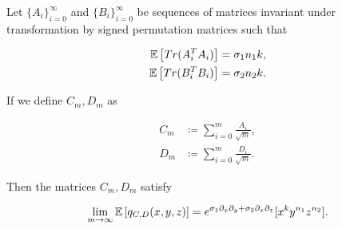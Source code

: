     \begin{theorem} \label{thm:exp_operator}
        Let $\{A_i\}_{i=0}^\infty$ and $\{B_i\}_{i=0}^\infty$ be sequences of matrices invariant under transformation by signed permutation matrices such that

        \begin{align*}
            \mathbb E \left[ Tr(A^T_iA_i) \right] &= \sigma_1 n_1 k,\\
            \mathbb E \left[ Tr(B^T_iB_i) \right] &= \sigma_2 n_2 k.
        \end{align*}

        If we define $C_m, D_m$ as

        \begin{align*}
            C_m &\coloneqq \sum_{i=0}^m \frac{A_i}{\sqrt m}, \\
            D_m &\coloneqq \sum_{i=0}^m \frac{D_i}{\sqrt m}.
        \end{align*}

        Then the matrices $C_m, D_m$ satisfy

        \begin{equation*}
            \lim_{m\to\infty} \mathbb E \left[ q_{C,D}(x,y,z) \right] = e^{\sigma_1 \partial_x \partial_y + \sigma_2 \partial_x \partial_z}[x^k y^{n_1} z^{n_2}].
        \end{equation*}
    \end{theorem}

